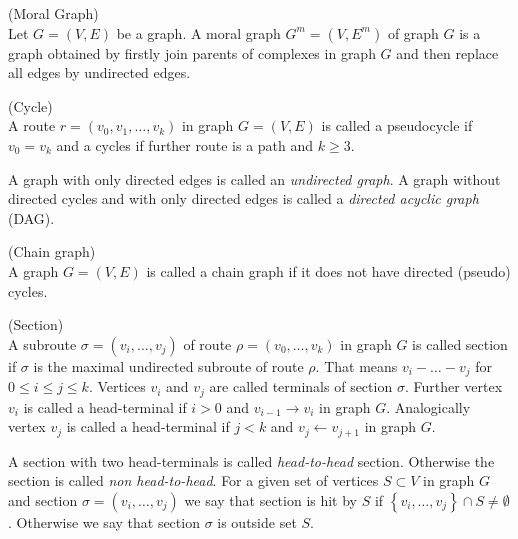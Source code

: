 \begin{defi} \label{moralGraphDef} (Moral Graph) \\
	Let $G = (V, E)$ be a graph. A moral graph $G^{m} = (V, E^{m})$ of graph $G$ is a graph obtained by firstly join parents of complexes in graph $G$ and then replace all edges by undirected edges.
\end{defi}


\begin{defi} (Cycle) \\
	A route $r = (v_0, v_1, \dots, v_k)$ in graph $G = (V, E)$ is called a pseudocycle if $v_0 = v_k$ and 
	a cycles if further route is a path and $k \ge 3$.
\end{defi}

A graph with only directed edges is called an \textit{undirected graph}. A graph without directed cycles 
and with only directed edges is called a \textit{directed acyclic graph} (DAG).


\begin{defi}\label{chainGraphDef} (Chain graph)  \\
	A graph $G = (V, E)$ is called a chain graph if it does not have directed (pseudo) cycles.
\end{defi}



\begin{defi} (Section) \\
	A subroute $\sigma = (v_i, \dots, v_j)$ of route $\rho = (v_0, \dots, v_k)$ in graph $G$ is called section if $			\sigma$ is the maximal undirected subroute of route $\rho$. That means $v_i - \dots - v_j$ for $0 \le i \le j 			\le k$. Vertices $v_i$ and $v_j$ are called terminals of section $\sigma$. Further vertex $v_i$ is called a 			head-terminal if $i>0$ and $v_{i-1} \rightarrow v_i$ in graph $G$. Analogically vertex $v_j$ is called 
	a head-terminal if $j<k$ and $v_j \leftarrow v_{j+1}$ in graph $G$.
\end{defi}


A section with two head-terminals is called \textit{head-to-head} section. Otherwise the section is called 
\textit{non head-to-head}. For a given set of vertices $S \subset V$ in graph $G$ and section $\sigma = (v_i, \dots, v_j)$ we say that section is hit by $S$ if $\left\lbrace v_i , \dots, v_j \right\rbrace \cap S \neq \emptyset$. Otherwise we say that section $\sigma$ is outside set $S$.



